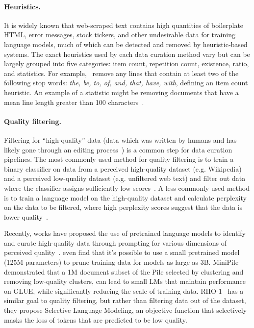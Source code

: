 \documentclass{article}
\begin{document}
\paragraph{Heuristics.}
It is widely known that web-scraped text contains high quantities of boilerplate HTML, error messages, stock tickers, and other undesirable data for training language models, much of which can be detected and removed by heuristic-based systems. The exact heuristics used by each data curation method vary but can be largely grouped into five categories: item count, repetition count, existence, ratio, and statistics. For example,~\citet{gopher} remove any lines that contain at least two of the following stop words: \emph{the, be, to, of, and, that, have, with}, defining an item count heuristic. An example of a statistic might be removing documents that have a mean line length greater than 100 characters~\citep{Chen2021EvaluatingLL}.

\paragraph{Quality filtering.}
Filtering for ``high-quality'' data (data which was written by humans and has likely gone through an editing process~\citep{albalak2024survey}) is a common step for data curation pipelines. The most commonly used method for quality filtering is to train a binary classifier on data from a perceived high-quality dataset (e.g. Wikipedia) and a perceived low-quality dataset (e.g. unfiltered web text) and filter out data where the classifier assigns sufficiently low scores~\citep{pile, gpt3, du2022glam}. A less commonly used method is to train a language model on the high-quality dataset and calculate perplexity on the data to be filtered, where high perplexity scores suggest that the data is lower quality~\citep{wenzek-etal-2020-ccnet,muennighoff2023scaling}.

Recently, works have proposed the use of pretrained language models to identify and curate high-quality data through prompting for various dimensions of perceived quality~\citep{wettig2024qurating, sachdeva2024train, lozhkov2024fineweb-edu}. \citet{ankner2024perplexed} even find that it's possible to use a small pretrained model (125M parameters) to prune training data for models as large as 3B. MiniPile~\citep{kaddour2023minipile} demonstrated that a 1M document subset of the Pile selected by clustering and removing low-quality clusters, can lead to small LMs that maintain performance on GLUE, while significantly reducing the scale of training data.
RHO-1~\citep{lin2024rho1} has a similar goal to quality filtering, but rather than filtering data out of the dataset, they propose Selective Language Modeling, an objective function that selectively masks the loss of tokens that are predicted to be low quality.
\end{document}
